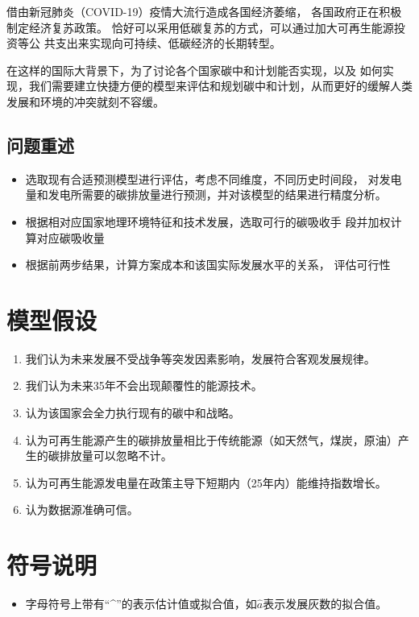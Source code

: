 \documentclass[bwprint]{gmcmthesis}
\numberwithin{figure}{section}
\newcommand{\upcite}[1]{\textsuperscript{\textsuperscript{\cite{#1}}}}
\begin{document}
借由新冠肺炎（COVID-19）疫情大流行造成各国经济萎缩，
各国政府正在积极制定经济复苏政策。
恰好可以采用低碳复苏的方式，可以通过加大可再生能源投资等公
共支出来实现向可持续、低碳经济的长期转型。

在这样的国际大背景下，为了讨论各个国家碳中和计划能否实现，以及
如何实现，我们需要建立快捷方便的模型来评估和规划碳中和计划，从而更好的缓解人类
发展和环境的冲突就刻不容缓。
\subsection{问题重述}
\begin{itemize}
	\item 选取现有合适预测模型进行评估，考虑不同维度，不同历史时间段，
	对发电量和发电所需要的碳排放量进行预测，并对该模型的结果进行精度分析。
	\item 根据相对应国家地理环境特征和技术发展，选取可行的碳吸收手
	段并加权计算对应碳吸收量
	\item 根据前两步结果，计算方案成本和该国实际发展水平的关系，
	评估可行性
\end{itemize}

\section{模型假设}
\begin{enumerate}
\item 我们认为未来发展不受战争等突发因素影响，发展符合客观发展规律。\upcite{bib:4}
\item 我们认为未来35年不会出现颠覆性的能源技术。
\item 认为该国家会全力执行现有的碳中和战略。\label{jiashe}
\item 认为可再生能源产生的碳排放量相比于传统能源（如天然气，煤炭，原油）产生的碳排放量可以忽略不计。\upcite{kezaishengnengyuan}
\item 认为可再生能源发电量在政策主导下短期内（25年内）能维持指数增长。
\item 认为数据源准确可信。
\end{enumerate}

\section{符号说明}
\begin{itemize}
	\item 字母符号上带有“\^{}”的表示估计值或拟合值，如$\hat{a}$表示发展灰数的拟合值。
\end{itemize}
\end{document}
